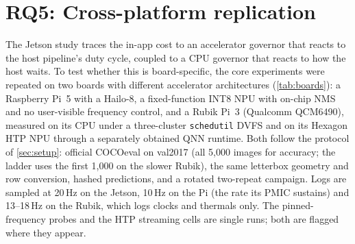 \section{RQ5: Cross-platform replication}
\label{sec:crossplatform}

The Jetson study traces the in-app cost to an accelerator governor
that reacts to the host pipeline's duty cycle, coupled to a CPU
governor that reacts to how the host waits. To test whether this is
board-specific, the core experiments were repeated on two boards with
different accelerator architectures (\cref{tab:boards}): a Raspberry
Pi~5 with a Hailo-8, a fixed-function INT8 NPU with on-chip NMS and no
user-visible frequency control, and a Rubik Pi~3 (Qualcomm QCM6490),
measured on its CPU under a three-cluster \texttt{schedutil} DVFS and
on its Hexagon HTP NPU through a separately obtained QNN runtime. Both
follow the protocol of \cref{sec:setup}: official COCOeval on val2017
(all 5,000 images for accuracy; the ladder uses the first 1,000 on the
slower Rubik), the same letterbox geometry and row conversion, hashed
predictions, and a rotated two-repeat campaign. Logs are sampled at
20\,Hz on the Jetson, 10\,Hz on the Pi (the rate its PMIC sustains)
and 13--18\,Hz on the Rubik, which logs clocks and thermals only. The
pinned-frequency probes and the HTP streaming cells are single runs;
both are flagged where they appear.

